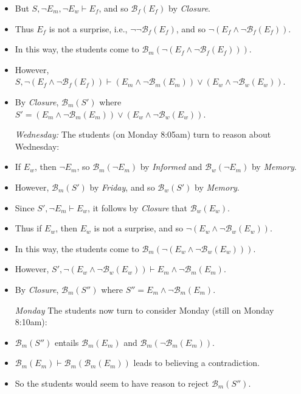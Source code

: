\documentclass[a4paper, 11pt]{article} %
\newcommand{\B}{\mathcal{B}}
\newcommand{\B}{\mathfrak{B}}
\begin{document}
\begin{itemize}
    \item But $S, \neg E_m, \neg E_w \vdash E_f$, and so $\B_f(E_f)$ by \textit{Closure}. 
    \item Thus $E_f$ is not a surprise, i.e., $\neg \neg \B_f(E_f)$, and so $\neg (E_f \wedge \neg \B_f(E_f))$.
    \item In this way, the students come to $\B_m(\neg (E_f \wedge \neg \B_f(E_f)))$.
    \item However, $S, \neg (E_f \wedge \neg \B_f(E_f)) \vdash (E_m \wedge \neg \B_m(E_m)) \vee (E_w \wedge \neg \B_w(E_w))$.
    \item By \textit{Closure}, $\B_m(S')$ where $S' = (E_m \wedge \neg \B_m(E_m)) \vee (E_w \wedge \neg \B_w(E_w))$.
  \item[\it Wednesday:] The students (on Monday 8:05am) turn to reason about Wednesday:
    \item If $E_w$, then $\neg E_m$, so $\B_m(\neg E_m)$ by \textit{Informed} and $\B_w(\neg E_m)$ by \textit{Memory}.
    \item However, $\B_m(S')$ by \textit{Friday}, and so $\B_w(S')$ by \textit{Memory}.
    \item Since $S', \neg E_m \vdash E_w$, it follows by \textit{Closure} that $\B_w(E_w)$.
    \item Thus if $E_w$, then $E_w$ is not a surprise, and so  $\neg (E_w \wedge \neg \B_w(E_w))$.
    \item In this way, the students come to $\B_m(\neg (E_w \wedge \neg \B_w(E_w)))$.
    \item However, $S', \neg (E_w \wedge \neg \B_w(E_w)) \vdash E_m \wedge \neg \B_m(E_m)$.
    \item By \textit{Closure}, $\B_m(S'')$ where $S'' = E_m \wedge \neg \B_m(E_m)$. 
  \item[\it Monday] The students now turn to consider Monday (still on Monday 8:10am):
    \item $\B_m(S'')$ entails $\B_m(E_m)$ and $\B_m(\neg \B_m(E_m))$. %
    \item $\B_m(E_m) \vdash \B_m(\B_m(E_m))$ leads to believing a contradiction.
    \item So the students would seem to have reason to reject $\B_m(S'')$.
\end{itemize}
\end{document}
